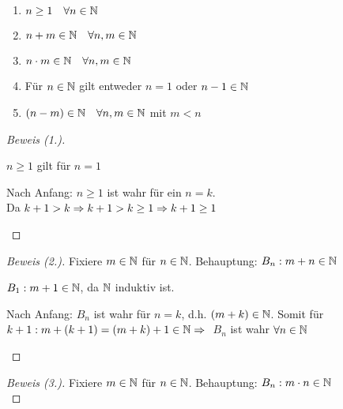 \newpage

\begin{satz}
    \label{satz:n-eigenschaften}
    \theoremescape
    \begin{enumerate}
        \item $n\geq 1\quad\forall n\in\mathbb{N}$
        \item $n+m\in\mathbb{N}\quad\forall n,m\in\mathbb{N}$
        \item $n\cdot m\in\mathbb{N}\quad\forall n,m\in\mathbb{N}$
        \item Für $n\in\mathbb{N}$ gilt entweder $n=1$ oder $n-1\in\mathbb{N}$
        \item $(n-m) \in \mathbb{N}\quad\forall n,m\in\mathbb{N}$ mit $m<n$
    \end{enumerate}
    \begin{proof}[Beweis (1.)]
        ~\\
        \begin{induktionsanfang}
            $n\geq 1$ gilt für $n=1$
        \end{induktionsanfang}
        \begin{induktionsschritt}
            Nach Anfang: $n\geq 1$ ist wahr für ein $n=k$.\\
            Da $k+1>k\Rightarrow{} k+1>k\geq 1 \Rightarrow{} k+1\geq 1$\qedhere
        \end{induktionsschritt}
    \end{proof}
    \begin{proof}[Beweis (2.)]
        Fixiere $m\in\mathbb{N}$ für $n\in\mathbb{N}$. Behauptung: $B_n: m+n\in \mathbb{N}$\\
        \begin{induktionsanfang}
            $B_1: m+1 \in \mathbb{N}$, da $\mathbb{N}$ induktiv ist.
        \end{induktionsanfang}
        \begin{induktionsschritt}
            Nach Anfang: $B_n$ ist wahr für $n=k$, d.h. $(m+k)\in\mathbb{N}$. Somit für $k+1: m+(k+1) = (m+k)+1\in\mathbb{N} \Rightarrow{}$ $B_n$ ist wahr $\forall n\in\mathbb{N}$\qedhere
        \end{induktionsschritt}
    \end{proof}
    \begin{proof}[Beweis (3.)]
        Fixiere $m\in\mathbb{N}$ für $n\in\mathbb{N}$. Behauptung: $B_n: m\cdot n\in \mathbb{N}$\\

\end{proof}
\end{satz}
